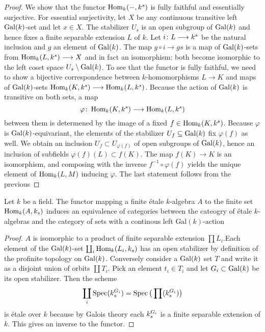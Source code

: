 \begin{proof}
	We show that the functor $\operatorname{Hom}_k(-,k^s)$ is fully faithful and essentially surjective. For essential surjectivity, let $X$ be any continuous transitive left $\operatorname{Gal}(k)$-set and let $x \in X$. The stabilizer $U_s$ is an open subgroup of $\operatorname{Gal}(k)$ and hence fixes a finite separable extension $L$ of $k$. Let $i \colon L \longrightarrow k^s$ be the natural inclusion and $g$ an element of $\operatorname{Gal}(k)$. The map $g \circ i \to gs$ is a map of $\operatorname{Gal}(k)$-sets from $\operatorname{Hom}_k(L,k^s) \longrightarrow X$ and in fact an isomorphism: both become isomorphic to the left coset space $U_s\setminus \operatorname{Gal}(k)$.
	To see that the functor is fully faithful, we need to show a bijective correspondence between $k$-homomorphisms $L \to K$ and maps of $\operatorname{Gal}(k)$-sets $\operatorname{Hom}_k(K, k^s) \longrightarrow \operatorname{Hom}_k(L, k^s)$. Because the action of $\operatorname{Gal}(k)$ is transitive on both sets, a map
	\[
		\varphi \colon \operatorname{Hom}_k(K, k^s) \longrightarrow \operatorname{Hom}_k(L, k^s)
	\]
	between them is determened by the image of a fixed $f \in \operatorname{Hom}_k(K, k^s)$. Because $\varphi$ is $\operatorname{Gal}(k)$-equivariant, the elements of the stabilizer $U_f \subseteq \operatorname{Gal}(k)$ fix $\varphi(f)$ as well. We obtain an inclusion $U_f \subset U_{\varphi(f)}$ of open subgroups of $\operatorname{Gal}(k)$, hence an inclusion of subfields $\varphi(f)(L) \subset f(K)$. The map $f(K) \to K$ is an isomorphism, and composing with the inverse $f^{-1} \circ \varphi(f)$ yields the unique element of $\operatorname{Hom}_k(L,M)$ inducing $\varphi$. The last statement follows from the previous
\end{proof}

\begin{theorem}\label{theorem:galois_grothendieck}
	Let $k$ be a field. The functor mapping a finite \'etale $k$-algebra $A$ to the finite set $\operatorname{Hom}_k(A, k_s)$ induces an equivalence of categories between the cateogry of \'etale $k$-algebras and the category of sets with a continous left $\text{Gal}(k)$-action
\end{theorem}

\begin{proof}
	$A$ is isomorphic to a product of finite separable extension $\prod L_i$.Each element of the $\operatorname{Gal}(k)$-set $\coprod_i \operatorname{Hom}_k(L_i, k_s)$ has an open stabilizer by definition of the profinite topology on $\operatorname{Gal}(k)$. Conversely consider a $\operatorname{Gal}(k)$ set $T$ and write it as a disjoint union of orbits $\coprod T_i$. Pick an element $t_i \in T_i$ and let $G_i \subset \operatorname{Gal}(k)$ be its open stabilizer. Then the scheme
	\[
		\coprod_i \operatorname{Spec}(k_s^{G_i}) = \operatorname{Spec}\big(\prod(k^{G_i}_s)\big)
	\]
	is \'etale over $k$ because by Galois theory each $k_s^{G_i}$ is a finite separable extension of $k$. This gives an inverse to the functor.
\end{proof}

